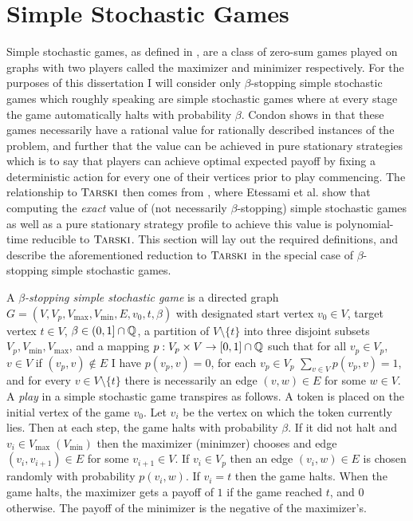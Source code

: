 \section{Simple Stochastic Games}\label{ssgs}
Simple stochastic games, as defined in \citep{condon}, are a class of
zero-sum games played on graphs with two players called the maximizer and minimizer
respectively. For the purposes of this dissertation I will consider only $\beta$-stopping
simple stochastic games which roughly speaking are simple stochastic games
where at every stage the game automatically halts with probability $\beta$.
Condon shows in \citep{condon} that these games necessarily have a rational value for rationally described instances
of the problem, and further that
the value can be achieved in pure stationary strategies which is to say
that players can achieve optimal expected payoff by fixing a deterministic
action for every one of their vertices prior to play commencing.
The relationship to $\textsc{Tarski}$ then comes from \citep{lowerBound}, where Etessami et al. show
that computing the \emph{exact} value of (not necessarily $\beta$-stopping) simple stochastic games as well as a pure stationary strategy profile
to achieve this value is 
polynomial-time reducible to $\textsc{Tarski}$. This section will lay out the required definitions,
and describe the aforementioned reduction to $\textsc{Tarski}$ in the special case of 
$\beta$-stopping simple stochastic games.

\newcommand{\vmax}{V_{\max}}
\newcommand{\vmin}{V_{\min}}
\begin{definition}
  A \emph{$\beta$-stopping simple stochastic game} is a directed graph $G = (V, V_p, \vmax, \vmin, E, v_0, t, \beta)$ with designated start vertex $v_0 \in V$,
  target vertex $t \in V$, $\beta \in (0, 1] \cap \mathbb{Q}$,
  a partition of $V \setminus \{t\}$ into three disjoint subsets $V_p, V_{\min}, V_{\max}$,
  and a mapping $p : V_p \times V \to [0, 1] \cap \mathbb{Q}$
  such that for all $v_p \in V_p$,
  $v \in V$ if $(v_p, v) \not\in E$ I have $p(v_p, v) = 0$, for each
  $v_p \in V_p$ $\sum_{v \in V} p(v_p, v) = 1$, and for every $v \in V \setminus \{t\}$ there
  is necessarily an edge $(v, w) \in E$ for some $w \in V$. A \emph{play} in a simple stochastic game
  transpires as follows. A token is placed on the initial vertex of the game $v_0$.
  Let $v_i$ be the vertex on which the token currently lies. Then at each step, the game halts with probability $\beta$. If it did not halt and $v_i \in \vmax \; (\vmin)$
  then the maximizer (minimzer) chooses and edge $(v_i, v_{i + 1}) \in E$ for some $v_{i + 1} \in V$. If
  $v_i \in V_p$ then an edge $(v_i, w) \in E$ is chosen randomly with probability $p(v_i, w)$. If $v_i = t$
  then the game halts. 
  When the game halts, the maximizer gets a payoff of $1$ if the game reached
  $t$, and $0$ otherwise. The payoff of the minimizer is the negative of the maximizer's.
\end{definition}

